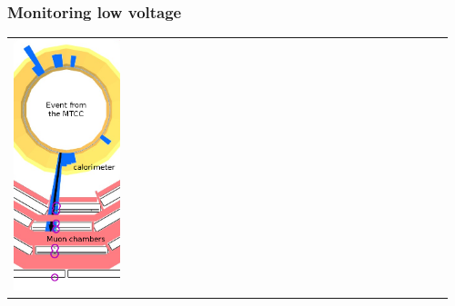 \documentclass[compress]{beamer}
\begin{document}
\begin{frame}
\frametitle{Monitoring low voltage}
\begin{tabular}{p{0.26\linewidth} p{0.7\linewidth}}
  \begin{minipage}{\linewidth}
    \vspace{0.5 cm} \hspace{-0.7 cm} \includegraphics[width=\linewidth]{plots/Run2269_Ev61.png}

\end{minipage}
\end{tabular}
\end{frame}
\end{document}
